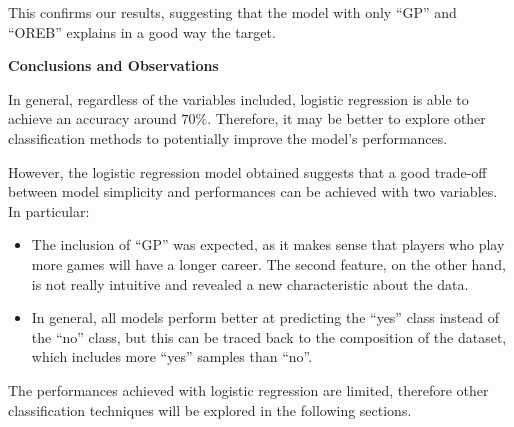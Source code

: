 This confirms our results, suggesting that the model with only ``GP'' and ``OREB'' explains in a good way the target. 

\vspace{0.2cm}
\textbf{Conclusions and Observations}

In general, regardless of the variables included, logistic regression is able to achieve an accuracy around $70\%$. Therefore, it may be better to explore other classification methods to potentially improve the model's performances.

However, the logistic regression model obtained suggests that a good trade-off between model simplicity and performances can be achieved with two variables. In particular:

\begin{itemize}
	\item The inclusion of ``GP'' was expected, as it makes sense that players who play more games will have a longer career. The second feature, on the other hand, is not really intuitive and revealed a new characteristic about the data.
	\item In general, all models perform better at predicting the ``yes'' class instead of the ``no'' class, but this can be traced back to the composition of the dataset, which includes more ``yes'' samples than ``no''.
\end{itemize}

The performances achieved with logistic regression are limited, therefore other classification techniques will be explored in the following sections.
